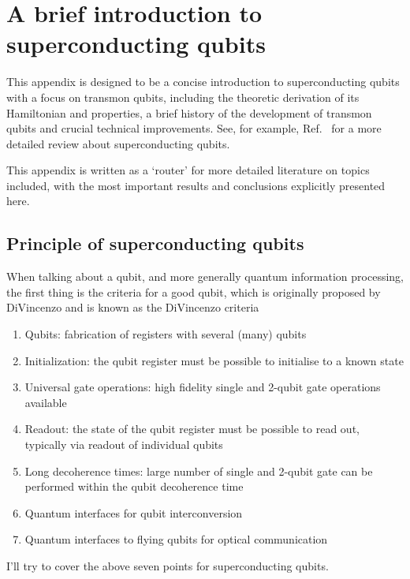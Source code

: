 
\chapter{A brief introduction to superconducting qubits} %
\label{cha:SCQubitPrinciple}
  

This appendix is designed to be a concise introduction to superconducting qubits with a focus on transmon qubits, including the theoretic derivation of its Hamiltonian and properties, a brief history of the development of transmon qubits and crucial technical improvements. See, for example, Ref.~ for a more detailed review about superconducting qubits.

This appendix is written as a `router' for more detailed literature on topics included, with the most important results and conclusions explicitly presented here.

\section{Principle of superconducting qubits} %
\label{sec:principle_of_superconducting_qubit}
    
    When talking about a qubit, and more generally quantum information processing, the first thing is the criteria for a good qubit, which is originally proposed by DiVincenzo\cite{divincenzo2000physical} and is known as the DiVincenzo criteria
    \begin{enumerate}
        \item Qubits: fabrication of registers with several (many) qubits
        \item Initialization: the qubit register must be possible to initialise to a known state
        \item Universal gate operations: high fidelity single and 2-qubit gate operations available
        \item Readout: the state of the qubit register must be possible to read out, typically via readout of individual qubits
        \item Long decoherence times: large number of single and 2-qubit gate can be performed within the qubit decoherence time
        \item Quantum interfaces for qubit interconversion
        \item Quantum interfaces to flying qubits for optical communication
    \end{enumerate}
    I'll try to cover the above seven points for superconducting qubits.


